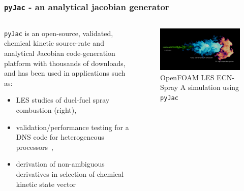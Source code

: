 \documentclass{beamer}
\begin{document}
\begin{frame}
 \frametitle{\texttt{pyJac} - an analytical jacobian generator}
 \begin{columns}[c]
  \begin{column}{0.6\textwidth}
  \begin{minipage}[c]{\columnwidth}
    \texttt{pyJac} is an open-source, validated, chemical kinetic source-rate and analytical Jacobian code-generation platform with thousands of downloads, and has been used in applications such as:
    \begin{itemize}
     \item LES studies of duel-fuel spray combustion (right),
     \item validation\slash performance testing for a DNS code for heterogeneous processors~,
     \item derivation of non-ambiguous derivatives in selection of chemical kinetic state vector~
    \end{itemize}
    \vfill
  \end{minipage}
  \end{column}
  \begin{column}{0.4\textwidth}
    \begin{center}
     \begin{figure}
      \centering
      \includegraphics[width=\columnwidth]{spray.png}
      \caption{OpenFOAM LES ECN-Spray A simulation using \texttt{pyJac}}
     \end{figure}
    \end{center}
  \end{column}
 \end{columns}
\end{frame}
\end{document}
